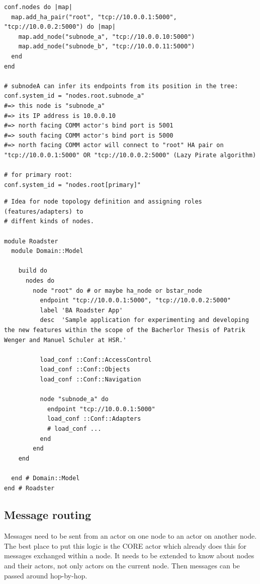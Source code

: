 \begin{lstlisting}[style=customruby, caption={Cluster DSL example with HA}, label={lst:dsl:topo:with-ha}]
conf.nodes do |map|
  map.add_ha_pair("root", "tcp://10.0.0.1:5000", "tcp://10.0.0.2:5000") do |map|
    map.add_node("subnode_a", "tcp://10.0.0.10:5000")
    map.add_node("subnode_b", "tcp://10.0.0.11:5000")
  end
end

# subnodeA can infer its endpoints from its position in the tree:
conf.system_id = "nodes.root.subnode_a"
#=> this node is "subnode_a"
#=> its IP address is 10.0.0.10
#=> north facing COMM actor's bind port is 5001
#=> south facing COMM actor's bind port is 5000
#=> north facing COMM actor will connect to "root" HA pair on "tcp://10.0.0.1:5000" OR "tcp://10.0.0.2:5000" (Lazy Pirate algorithm)

# for primary root:
conf.system_id = "nodes.root[primary]"
\end{lstlisting}

\begin{lstlisting}[style=customruby, caption={Cluster DSL example with HA and roles}, label={lst:dsl:topo:with-roles}]
# Idea for node topology definition and assigning roles (features/adapters) to
# diffent kinds of nodes.

module Roadster
  module Domain::Model

    build do
      nodes do
        node "root" do # or maybe ha_node or bstar_node
          endpoint "tcp://10.0.0.1:5000", "tcp://10.0.0.2:5000"
          label 'BA Roadster App'
          desc  'Sample application for experimenting and developing the new features within the scope of the Bacherlor Thesis of Patrik Wenger and Manuel Schuler at HSR.'

          load_conf ::Conf::AccessControl
          load_conf ::Conf::Objects
          load_conf ::Conf::Navigation

          node "subnode_a" do
            endpoint "tcp://10.0.0.1:5000"
            load_conf ::Conf::Adapters
            # load_conf ...
          end
        end
    end

  end # Domain::Model
end # Roadster
\end{lstlisting}


\subsection{Message routing}
Messages need to be sent from an actor on one node to an actor on another node. The best place to put this logic is the CORE actor which already does this for messages exchanged within a node. It needs to be extended to know about nodes and their actors, not only actors on the current node. Then messages can be passed around hop-by-hop.

